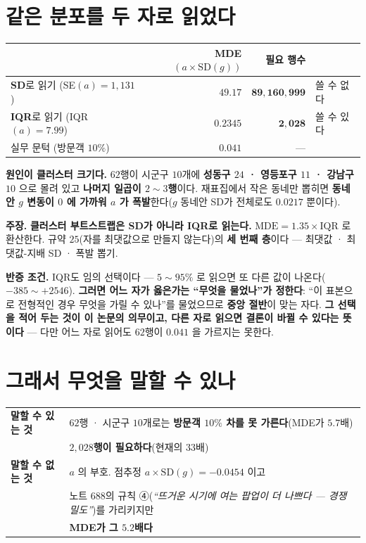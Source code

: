 \documentclass[10pt,a4paper]{article}
\newcommand{\claim}[2]{\begin{claimbox}\textbf{주장.} #1\par\smallskip
  \textcolor{gray!70}{\textbf{반증 조건.} #2}\end{claimbox}}
\begin{document}
\section{같은 분포를 두 자로 읽었다}

\begin{center}
\begin{tabular}{lrrl}
\toprule
& MDE$(a \times \text{SD}(g))$ & 필요 행수 & \\
\midrule
\textbf{SD}로 읽기 (SE$(a) = 1{,}131$) & $49.17$ & $\mathbf{89{,}160{,}999}$ & 쓸 수 없다 \\
\textbf{IQR}로 읽기 (IQR$(a) = 7.99$) & $\mathbf{0.2345}$ & $\mathbf{2{,}028}$ & 쓸 수 있다 \\
\midrule
실무 문턱 (방문객 $10\%$) & $0.041$ & --- & \\
\bottomrule
\end{tabular}
\end{center}

\textbf{원인이 클러스터 크기다.} $62$행이 시군구 $10$개에 \textbf{성동구 $24$ ·
영등포구 $11$ · 강남구 $10$} 으로 몰려 있고 \textbf{나머지 일곱이 $2{\sim}3$행}이다.
재표집에서 작은 동네만 뽑히면 \textbf{동네 안 $g$ 변동이 $0$ 에 가까워 $a$ 가
폭발}한다($g$ 동네안 SD가 전체로도 $0.0217$ 뿐이다).

\claim{\textbf{클러스터 부트스트랩은 SD가 아니라 IQR로 읽는다.} $\text{MDE} = 1.35
\times \text{IQR}$ 로 환산한다. 규약 $25$(자를 최댓값으로 만들지 않는다)의 \textbf{세
번째 층}이다 --- 최댓값 · 최댓값-지배 SD · 폭발 뽑기.}
{IQR도 임의 선택이다 --- $5{\sim}95\%$ 로 읽으면 또 다른 값이 나온다($-385 \sim
+2546$). \textbf{그러면 어느 자가 옳은가는 ``무엇을 물었나''가 정한다}: ``이 표본으로
전형적인 경우 무엇을 가릴 수 있나''를 물었으므로 \textbf{중앙 절반}이 맞는 자다.
\textbf{그 선택을 적어 두는 것이 이 논문의 의무이고, 다른 자로 읽으면 결론이 바뀔 수
있다는 뜻이다} --- 다만 어느 자로 읽어도 $62$행이 $0.041$ 을 가르지는 못한다.}

\section{그래서 무엇을 말할 수 있나}

\begin{center}
\begin{tabular}{ll}
\toprule
\textbf{말할 수 있는 것} & $62$행 · 시군구 $10$개로는 \textbf{방문객 $10\%$ 차를 못
가른다}(MDE가 $5.7$배) \\
& \textbf{$2{,}028$행이 필요하다}(현재의 $33$배) \\
\midrule
\textbf{말할 수 없는 것} & $a$ 의 부호. 점추정 $a \times \text{SD}(g) = -0.0454$ 이고 \\
& 노트 $688$의 규칙 ④(\emph{``뜨거운 시기에 여는 팝업이 더 나쁘다 --- 경쟁 밀도''})를
가리키지만 \\
& \textbf{MDE가 그 $5.2$배다} \\
\bottomrule
\end{tabular}
\end{center}
\end{document}
